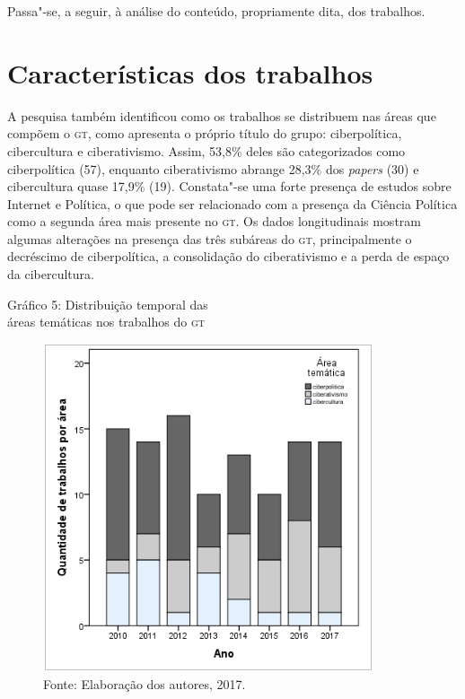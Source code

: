 Passa"-se, a seguir, à análise do conteúdo, propriamente dita, dos
trabalhos.

\section{Características dos trabalhos}

\noindent{}A pesquisa também identificou como os trabalhos se distribuem nas áreas
que compõem o \textsc{gt}, como apresenta o próprio título do grupo:
ciberpolítica, cibercultura e ciberativismo. Assim, 53,8\% deles são
categorizados como ciberpolítica (57), enquanto ciberativismo abrange
28,3\% dos \emph{papers} (30) e cibercultura quase 17,9\% (19).
Constata"-se uma forte presença de estudos sobre Internet e Política, o
que pode ser relacionado com a presença da Ciência Política como a
segunda área mais presente no \textsc{gt}. Os dados longitudinais mostram algumas
alterações na presença das três subáreas do \textsc{gt}, principalmente o
decréscimo de ciberpolítica, a consolidação do ciberativismo e a perda
de espaço da cibercultura.

\pagebreak
\begin{center}
Gráfico 5: Distribuição temporal das\\ áreas temáticas nos trabalhos do \textsc{gt}
\end{center}

\begin{figure}[!ht]
\centering
 \includegraphics[width=\textwidth]{./imgs/graf3_5.png}
\caption{Fonte: Elaboração dos autores, 2017.}
\end{figure}

